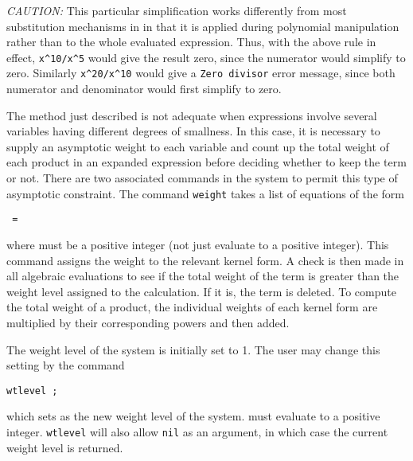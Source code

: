 \textit{CAUTION:}  This particular simplification works differently from most
substitution mechanisms in {\REDUCE} in that it is applied during
polynomial manipulation rather than to the whole evaluated expression.
Thus, with the above rule in effect,
\texttt{x\textasciicircum 10/x\textasciicircum 5} would give the
result zero, since the numerator would simplify to zero.  Similarly
\texttt{x\textasciicircum 20/x\textasciicircum 10} would give a
\texttt{Zero divisor} error message,
since both numerator and denominator would first simplify to zero.

\hypertarget{command:WEIGHT}{}
The method just described is not adequate when expressions involve several
variables having different degrees of smallness. In this case, it is
necessary to supply an asymptotic weight to each variable and count up the
total weight of each product in an expanded expression before deciding
whether to keep the term or not. There are two associated commands in the
system to permit this type of asymptotic constraint. The command
\texttt{weight}
takes a list of equations of the form
\begin{syntax}
  \texttt{ = }
\end{syntax}
where  must be a positive integer (not just evaluate to a
positive integer).  This command assigns the weight  to the
relevant kernel form.  A check is then made in all algebraic evaluations
to see if the total weight of the term is greater than the weight level
assigned to the calculation.  If it is, the term is deleted.  To compute
the total weight of a product, the individual weights of each kernel form
are multiplied by their corresponding powers and then added.

\hypertarget{command:WTLEVEL}{}
The weight level of the system is initially set to 1. The user may change
this setting by the command
\begin{syntax}
        \texttt{wtlevel }\texttt{;}
\end{syntax}
which sets  as the new weight level of the system.
 must evaluate to a positive integer.  \texttt{wtlevel} will also
allow \texttt{nil} as an argument, in which case the current weight level is returned.
